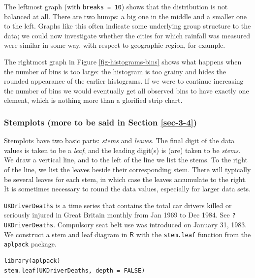 \documentclass[captions=tableheading]{scrbook}
\begin{document}
\begin{example}
The leftmost graph (with \texttt{breaks = 10}) shows that the distribution is not balanced at all. There are two humps: a big one in the middle and a smaller one to the left. Graphs like this often indicate some underlying group structure to the data; we could now investigate whether the cities for which rainfall was measured were similar in some way, with respect to geographic region, for example.

The rightmost graph in Figure \ref{fig-histograms-bins} shows what happens when the number of bins is too large: the histogram is too grainy and hides the rounded appearance of the earlier histograms. If we were to continue increasing the number of bins we would eventually get all observed bins to have exactly one element, which is nothing more than a glorified strip chart.

\end{example}
\subsubsection{Stemplots (more to be said in Section \ref{sec-3-4})}
\label{sec-3-1-2-3}


Stemplots have two basic parts: \emph{stems} and \emph{leaves}. The final digit of the data values is taken to be a \emph{leaf}, and the leading digit(s) is (are) taken to be \emph{stems}. We draw a vertical line, and to the left of the line we list the stems. To the right of the line, we list the leaves beside their corresponding stem. There will typically be several leaves for each stem, in which case the leaves accumulate to the right. It is sometimes necessary to round the data values, especially for larger data sets.

\begin{example}
\texttt{UKDriverDeaths} is a time series that contains the total car drivers killed or seriously injured in Great Britain monthly from Jan 1969 to Dec 1984. See \texttt{?UKDriverDeaths}. Compulsory seat belt use was introduced on January 31, 1983. We construct a stem and leaf diagram in \(\mathsf{R}\) with the \texttt{stem.leaf} function from the \texttt{aplpack} package\cite{aplpack}.
\end{example}


\lstset{language=R}
\begin{lstlisting}
library(aplpack)
stem.leaf(UKDriverDeaths, depth = FALSE)
\end{lstlisting}
\end{document}
